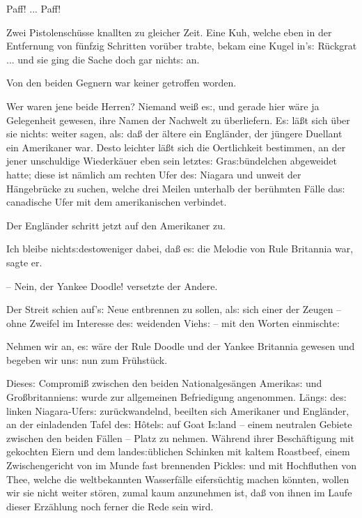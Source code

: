 \documentclass[oneside,12pt]{book}
\newenvironment{antiqua}{\normalfont}{}
\newcommand{\s}{s:}
\begin{document}
Paff! ... Paff!

Zwei Pistolensch\"usse knallten zu gleicher Zeit. Eine Kuh, welche
eben in der Entfernung von f\"unfzig Schritten vor\"uber trabte,
bekam eine Kugel in'{\s} R\"uckgrat ... und sie ging die Sache doch
gar nicht{\s} an.

Von den beiden Gegnern war keiner getroffen worden.

Wer waren jene beide Herren? Niemand wei{\ss} e{\s}, und gerade hier
w\"are ja Gelegenheit gewesen, ihre Namen der Nachwelt zu
\"uberliefern. E{\s} l\"a{\ss}t sich \"uber sie nicht{\s} weiter
sagen, al{\s} da{\ss} der \"altere ein Engl\"ander, der j\"ungere
Duellant ein Amerikaner war. Desto leichter l\"a{\ss}t sich die
Oertlichkeit bestimmen, an der jener unschuldige Wiederk\"auer eben
sein letzte{\s} Gra{\s}b\"undelchen abgeweidet hatte; diese ist
n\"amlich am rechten Ufer de{\s} Niagara und unweit der
H\"angebr\"ucke zu suchen, welche drei Meilen unterhalb der
ber\"uhmten F\"alle da{\s} canadische Ufer mit dem amerikanischen
verbindet.

Der Engl\"ander schritt jetzt auf den Amerikaner zu.

{\glqq}Ich bleibe nicht{\s}destoweniger dabei, da{\ss} e{\s} die
Melodie von \begin{antiqua}Rule Britannia\end{antiqua} war, sagte er.

-- Nein, der \begin{antiqua}Yankee Doodle\end{antiqua}!{\grqq}
versetzte der Andere.

Der Streit schien auf'{\s} Neue entbrennen zu sollen, al{\s} sich
einer der Zeugen -- ohne Zweifel im Interesse de{\s} weidenden
Vieh{\s} -- mit den Worten einmischte:

{\glqq}Nehmen wir an, e{\s} w\"are der \begin{antiqua}Rule
Doodle\end{antiqua} und der \begin{antiqua}Yankee
Britannia\end{antiqua} gewesen und begeben wir un{\s} nun zum
Fr\"uhst\"uck.{\grqq}

Diese{\s} Compromi{\ss} zwischen den beiden Nationalges\"angen
Amerika{\s} und Gro{\ss}britannien{\s} wurde zur allgemeinen
Befriedigung angenommen. L\"ang{\s} de{\s} linken Niagara-Ufer{\s}
zur\"uckwandelnd, beeilten sich Amerikaner und Engl\"ander, an der
einladenden Tafel de{\s} H\^otel{\s} auf Goat I{\s}land -- einem
neutralen Gebiete zwischen den beiden F\"allen -- Platz zu nehmen.
W\"ahrend ihrer Besch\"aftigung mit gekochten Eiern und dem
lande{\s}\"ublichen Schinken mit kaltem Roastbeef, einem
Zwischengericht von im Munde fast brennenden Pickle{\s} und mit
Hochfluthen von Thee, welche die weltbekannten Wasserf\"alle
eifers\"uchtig machen k\"onnten, wollen wir sie nicht weiter
st\"oren, zumal kaum anzunehmen ist, da{\ss} von ihnen im Laufe
dieser Erz\"ahlung noch ferner die Rede sein wird.
\end{document}
